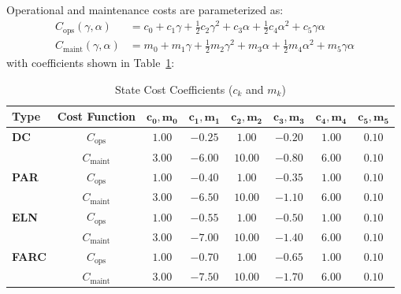 \documentclass[12pt]{article}
\numberwithin{equation}{section}
\numberwithin{table}{section}
\begin{document}
Operational and maintenance costs are parameterized as:
\begin{align}
C_{\text{ops}}(\gamma, \alpha) &= c_0 + c_1 \gamma + \frac{1}{2} c_2 \gamma^2 + c_3 \alpha + \frac{1}{2} c_4 \alpha^2 + c_5 \gamma \alpha \\
C_{\text{maint}}(\gamma, \alpha) &= m_0 + m_1 \gamma + \frac{1}{2} m_2 \gamma^2 + m_3 \alpha + \frac{1}{2} m_4 \alpha^2 + m_5 \gamma \alpha
\end{align}
with coefficients shown in Table~\ref{tab:state-cost-coefficients}:
\begin{table}[h!]
\centering
\caption{State Cost Coefficients ($c_k$ and $m_k$)}
\label{tab:state-cost-coefficients}
\begin{tabular}{lccccccc}
\toprule
\textbf{Type} & \textbf{Cost Function} & $\bm{c_0, m_0}$ & $\bm{c_1, m_1}$ & $\bm{c_2, m_2}$ & $\bm{c_3, m_3}$ & $\bm{c_4, m_4}$ & $\bm{c_5, m_5}$ \\
\midrule
\textbf{DC} & $C_{\text{ops}}$ & $1.00$ & $-0.25$ & $1.00$ & $-0.20$ & $1.00$ & $0.10$ \\
            & $C_{\text{maint}}$ & $3.00$ & $-6.00$ & $10.00$ & $-0.80$ & $6.00$ & $0.10$ \\
\midrule
\textbf{PAR} & $C_{\text{ops}}$ & $1.00$ & $-0.40$ & $1.00$ & $-0.35$ & $1.00$ & $0.10$ \\
             & $C_{\text{maint}}$ & $3.00$ & $-6.50$ & $10.00$ & $-1.10$ & $6.00$ & $0.10$ \\
\midrule
\textbf{ELN} & $C_{\text{ops}}$ & $1.00$ & $-0.55$ & $1.00$ & $-0.50$ & $1.00$ & $0.10$ \\
             & $C_{\text{maint}}$ & $3.00$ & $-7.00$ & $10.00$ & $-1.40$ & $6.00$ & $0.10$ \\
\midrule
\textbf{FARC} & $C_{\text{ops}}$ & $1.00$ & $-0.70$ & $1.00$ & $-0.65$ & $1.00$ & $0.10$ \\
              & $C_{\text{maint}}$ & $3.00$ & $-7.50$ & $10.00$ & $-1.70$ & $6.00$ & $0.10$ \\
\bottomrule
\end{tabular}
\end{table}
\end{document}
